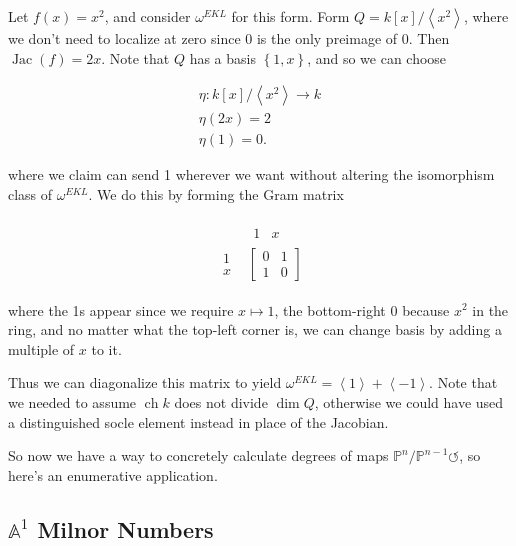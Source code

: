 \begin{example}[?]

Let \(f(x) = x^2\), and consider \(\omega^{EKL}\) for this form. Form
\(Q = k[x]/\left\langle{x^2}\right\rangle\), where we don't need to
localize at zero since \(0\) is the only preimage of \(0\). Then
\(\operatorname{Jac}(f) = 2x\). Note that \(Q\) has a basis
\(\left\{{1, x}\right\}\), and so we can choose

\begin{align*} \eta: k[x]/\left\langle{x^2}\right\rangle \to k \\ \eta(2x) = 2\\ \eta(1) = 0 .\end{align*}

where we claim can send 1 wherever we want without altering the
isomorphism class of \(\omega^{EKL}\). We do this by forming the Gram
matrix

\begin{align*}
\begin{array}{cc}
 &  \begin{matrix}1 & x\end{matrix} \\
    \begin{matrix}1 \\ x\end{matrix} &
    \begin{bmatrix}
      0 & 1 \\
      1 & 0
    \end{bmatrix}
\end{array}
\end{align*}

where the 1s appear since we require \(x\mapsto 1\), the bottom-right 0
because \(x^2\) in the ring, and no matter what the top-left corner is,
we can change basis by adding a multiple of \(x\) to it.

Thus we can diagonalize this matrix to yield
\(\omega^{EKL} = \left\langle{1}\right\rangle + \left\langle{-1}\right\rangle\).
Note that we needed to assume \(\operatorname{ch}k\) does not divide
\(\dim Q\), otherwise we could have used a distinguished socle element
instead in place of the Jacobian.

So now we have a way to concretely calculate degrees of maps
\({\mathbb{P}}^n /{\mathbb{P}}^{n-1}{\circlearrowleft}\), so here's an
enumerative application.

\end{example}

\hypertarget{mathbba1-milnor-numbers}{%
\subsection{\texorpdfstring{\({\mathbb{A}}^1\) Milnor
Numbers}{\{\textbackslash mathbb\{A\}\}\^{}1 Milnor Numbers}}\label{mathbba1-milnor-numbers}}


